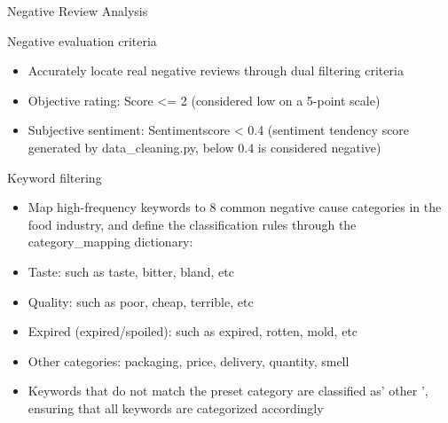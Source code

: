 \begin{frame}{Negative Review Analysis}
    
	\begin{block}{Negative evaluation criteria}
		\scriptsize
		\begin{itemize}
			\item Accurately locate real negative reviews through dual filtering criteria
			\item Objective rating: Score <= 2 (considered low on a 5-point scale)
			\item Subjective sentiment: Sentimentscore < 0.4 (sentiment tendency score generated by data\_cleaning.py, below 0.4 is considered negative)
		\end{itemize}
	\end{block}
    
	\begin{block}{Keyword filtering}
		\scriptsize
		\begin{itemize}
			\item Map high-frequency keywords to 8 common negative cause categories in the food industry, and define the classification rules through the category\_mapping dictionary:
			\item Taste: such as taste, bitter, bland, etc
			\item Quality: such as poor, cheap, terrible, etc
			\item Expired (expired/spoiled): such as expired, rotten, mold, etc
			\item Other categories: packaging, price, delivery, quantity, smell
			\item Keywords that do not match the preset category are classified as' other ', ensuring that all keywords are categorized accordingly
		\end{itemize}
	\end{block}

\end{frame}


















